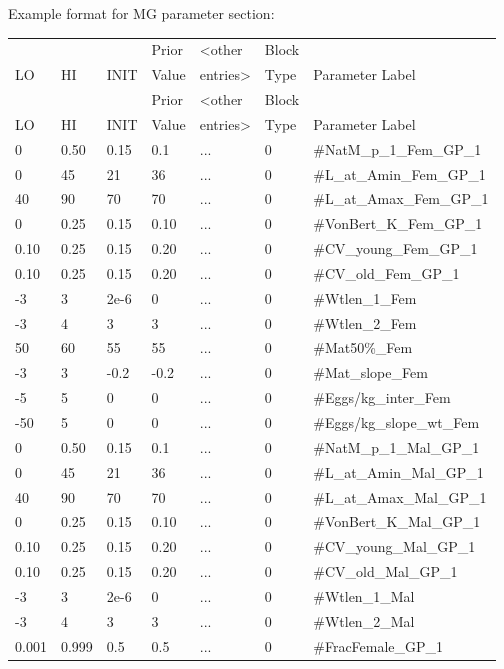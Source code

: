 Example format for MG parameter section:
\begin{center}

	\begin{longtable}{p{1cm} p{1cm} p{1cm}  p{1.5cm}  p{1.5cm}  p{1.5cm}  p{5cm}  }
		\hline
		 &  &  & Prior &  <other & Block &  \\
		LO & HI & INIT & Value &  entries> & Type & Parameter Label \\
		\hline
		\endfirsthead

		\hline
		&  &  & Prior &  <other & Block &  \\
		LO & HI & INIT & Value &  entries> & Type & Parameter Label \\
		\hline
		\endhead

		\endfoot

		\endlastfoot

		0    & 0.50 & 0.15 & 0.1  & ... & 0 & \#NatM\_p\_1\_Fem\_GP\_1\\
		0    & 45   & 21   & 36   & ... & 0 & \#L\_at\_Amin\_Fem\_GP\_1 \\
		40   & 90   & 70   & 70   & ... & 0 & \#L\_at\_Amax\_Fem\_GP\_1 \\
		0    & 0.25 & 0.15 & 0.10 & ... & 0 & \#VonBert\_K\_Fem\_GP\_1 \\
		0.10 & 0.25 & 0.15 & 0.20 & ... & 0 & \#CV\_young\_Fem\_GP\_1 \\
		0.10 & 0.25 & 0.15 & 0.20 & ... & 0 & \#CV\_old\_Fem\_GP\_1 \\
		-3   & 3    & 2e-6 & 0    & ... & 0 & \#Wtlen\_1\_Fem \\
		-3   & 4    & 3    & 3    & ... & 0 & \#Wtlen\_2\_Fem \\
		50   & 60   & 55   & 55   & ... & 0 & \#Mat50\%\_Fem  \\
		-3   & 3    & -0.2 & -0.2 & ... & 0 & \#Mat\_slope\_Fem \\
		-5   & 5    & 0    & 0    & ... & 0 & \#Eggs/kg\_inter\_Fem \\
		-50  & 5    & 0    & 0    & ... & 0 & \#Eggs/kg\_slope\_wt\_Fem \\
		0    & 0.50 & 0.15 & 0.1  & ... & 0 & \#NatM\_p\_1\_Mal\_GP\_1\\
		0    & 45   & 21   & 36   & ... & 0 & \#L\_at\_Amin\_Mal\_GP\_1 \\
		40   & 90   & 70   & 70   & ... & 0 & \#L\_at\_Amax\_Mal\_GP\_1 \\
		0    & 0.25 & 0.15 & 0.10 & ... & 0 & \#VonBert\_K\_Mal\_GP\_1 \\
		0.10 & 0.25 & 0.15 & 0.20 & ... & 0 & \#CV\_young\_Mal\_GP\_1 \\
		0.10 & 0.25 & 0.15 & 0.20 & ... & 0 & \#CV\_old\_Mal\_GP\_1 \\
		-3   & 3    & 2e-6 & 0    & ... & 0 & \#Wtlen\_1\_Mal \\
		-3   & 4    & 3    & 3    & ... & 0 & \#Wtlen\_2\_Mal \\
		0.001 & 0.999 & 0.5 & 0.5 & ... & 0 & \#FracFemale\_GP\_1 \\
		\hline
	\end{longtable}
\end{center}

